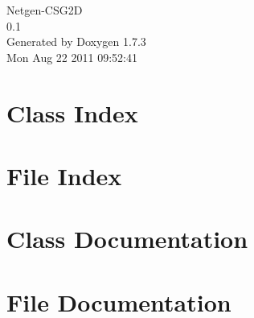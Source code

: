 \documentclass[a4paper]{book}
\begin{document}
\hypersetup{pageanchor=false}
\begin{titlepage}
\vspace*{7cm}
\begin{center}
{\Large Netgen-\/CSG2D \\[1ex]\large 0.1 }\\
\vspace*{1cm}
{\large Generated by Doxygen 1.7.3}\\
\vspace*{0.5cm}
{\small Mon Aug 22 2011 09:52:41}\\
\end{center}
\end{titlepage}
\clearemptydoublepage
{}
\tableofcontents
\clearemptydoublepage
{}
\hypersetup{pageanchor=true}
\chapter{Class Index}

\chapter{File Index}

\chapter{Class Documentation}








\chapter{File Documentation}












\printindex
\end{document}

